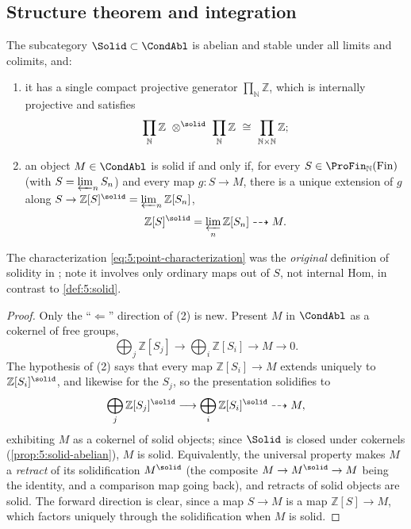\subsection{Structure theorem and integration}

\begin{theorem}
\label{thm:5:structure}
The subcategory $\Solid\subset\CondAbl$ is abelian and stable under all limits and
colimits, and:
\begin{enumerate}
\item it has a single compact projective generator $\prod_{\mathbb{N}}\mathbb{Z}$,
which is internally projective and satisfies
\begin{equation*}
\prod_{\mathbb{N}}\mathbb{Z}\ \otimes^{\solid}\ \prod_{\mathbb{N}}\mathbb{Z}
\ \cong\ \prod_{\mathbb{N}\times\mathbb{N}}\mathbb{Z};
\end{equation*}
\item an object $M\in\CondAbl$ is solid if and only if, for every $S\in
\ProFin_{\mathbb{N}}(\mathrm{Fin})$ (with $S=\varprojlim_n S_n$) and every map
$g\colon S\to M$, there is a unique extension of $g$ along
$S\to\mathbb{Z}[S]^{\solid}=\varprojlim_{n}\mathbb{Z}[S_{n}]$,
\begin{equation}
\label{eq:5:point-characterization}
\mathbb{Z}[S]^{\solid}=\varprojlim_{n}\mathbb{Z}[S_{n}]\dashrightarrow M .
\end{equation}
\end{enumerate}
\end{theorem}

The characterization \eqref{eq:5:point-characterization} was the \emph{original}
definition of solidity in \cite{clausen2019condensed}; note it involves only
ordinary maps out of $S$, not internal Hom, in contrast to \cref{def:5:solid}.

\begin{proof}
Only the ``$\Leftarrow$'' direction of (2) is new. Present $M$ in $\CondAbl$ as a
cokernel of free groups,
\begin{equation*}
\bigoplus_{j}\mathbb{Z}[S_{j}]\longrightarrow\bigoplus_{i}\mathbb{Z}[S_{i}]
\longrightarrow M\longrightarrow0 .
\end{equation*}
The hypothesis of (2) says that every map $\mathbb{Z}[S_{i}]\to M$ extends
uniquely to $\mathbb{Z}[S_{i}]^{\solid}$, and likewise for the $S_{j}$, so the
presentation solidifies to
\[
\bigoplus_{j}\mathbb{Z}[S_{j}]^{\solid}\longrightarrow
\bigoplus_{i}\mathbb{Z}[S_{i}]^{\solid}\dashrightarrow M ,
\]
exhibiting $M$ as a cokernel of solid objects; since $\Solid$ is closed under
cokernels (\cref{prop:5:solid-abelian}), $M$ is solid. Equivalently, the universal
property makes $M$ a \emph{retract} of its solidification $M^{\solid}$ (the
composite $M\to M^{\solid}\to M$ being the identity, and a comparison map going
back), and retracts of solid objects are solid. The forward direction is clear,
since a map $S\to M$ is a map $\mathbb{Z}[S]\to M$, which factors uniquely through
the solidification when $M$ is solid.
\end{proof}


